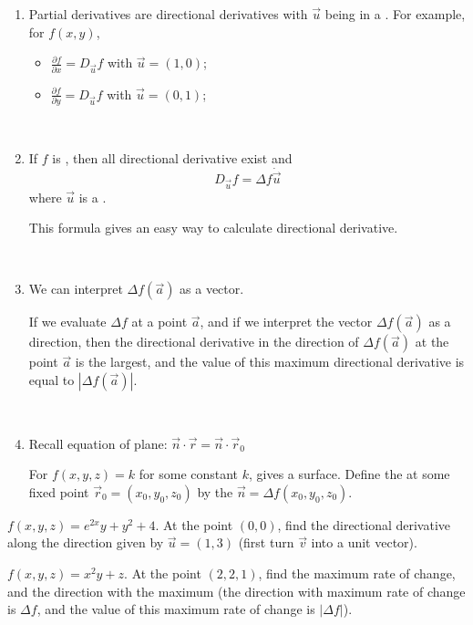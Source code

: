 \documentclass[11pt,fleqn]{book} %
\begin{document}
\begin{enumerate}
    \item Partial derivatives are directional derivatives with $\vec{u}$ being in a . For example, for $f(x,y)$, 

    \begin{itemize}
        \item $\frac{\partial f}{\partial x} = D_{\vec{u}} f$ with $\vec{u} = (1, 0)$;
        \item $\frac{\partial f}{\partial y} = D_{\vec{u}} f$ with $\vec{u} = (0, 1)$;
    \end{itemize}

    {~~~}

    \item If $f$ is , then all directional derivative exist and $$D_{\vec{u}} f = \Delta f \dot \vec{u}$$ where $\vec{u}$ is a . 
    
    This formula gives an easy way to calculate directional derivative.

    {~~~}

    \item We can interpret $\Delta f(\vec{a})$ as a vector. 
    
    If we evaluate $\Delta f$ at a point $\vec{a}$, and if we interpret the vector $\Delta f(\vec{a})$ as a direction, then the directional derivative in the direction of $\Delta f(\vec{a})$ at the point $\vec{a}$ is the largest, and the value of this maximum directional derivative is equal to $| \Delta f(\vec{a}) |$. 

    {~~~}

    \item Recall equation of plane: $\vec{n} \cdot \vec{r} = \vec{n} \cdot \vec{r}_0$
    
    For $f(x, y, z) = k$ for some constant $k$, gives a  surface. Define the  at some fixed point $\vec{r}_0 = (x_0, y_0, z_0)$ by the  $\vec{n} = \Delta f(x_0, y_0, z_0)$.
\end{enumerate}

\begin{exercise}
    $f(x, y, z) = e^{2x}y + y^2 + 4$. At the point $(0, 0)$, find the directional derivative along the direction given by $\vec{u} = (1, 3)$ (first turn $\vec{v}$ into a unit vector). 
\end{exercise}

\begin{exercise}
    $f(x, y, z) = x^2y + z$. At the point $(2, 2, 1)$, find the maximum rate of change, and the direction with the maximum (the direction with maximum rate of change is $\Delta f$, and the value of this maximum rate of change is $| \Delta f |$). 
\end{exercise}
\end{document}
